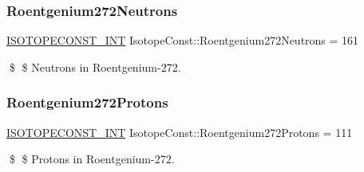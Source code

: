 \subsubsection{\texorpdfstring{Roentgenium272\+Neutrons}{Roentgenium272Neutrons}}
{\footnotesize\ttfamily \mbox{\hyperlink{group___isotope_const-_macros_ga5f18360b3e99483a35c32d789e62621c}{I\+S\+O\+T\+O\+P\+E\+C\+O\+N\+S\+T\+\_\+\+I\+NT}} Isotope\+Const\+::\+Roentgenium272\+Neutrons = 161}

\$ \$ Neutrons in Roentgenium-\/272. \mbox{\label{group___isotope_const-_roentgenium-_rg272_ga4e782dface87ca382786fd99f4077a51}} 
\subsubsection{\texorpdfstring{Roentgenium272\+Protons}{Roentgenium272Protons}}
{\footnotesize\ttfamily \mbox{\hyperlink{group___isotope_const-_macros_ga5f18360b3e99483a35c32d789e62621c}{I\+S\+O\+T\+O\+P\+E\+C\+O\+N\+S\+T\+\_\+\+I\+NT}} Isotope\+Const\+::\+Roentgenium272\+Protons = 111}

\$ \$ Protons in Roentgenium-\/272. 